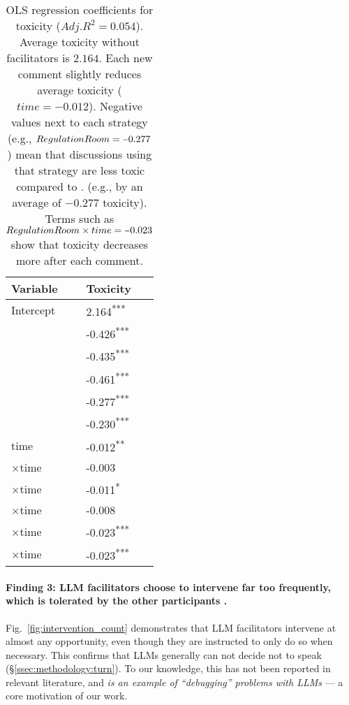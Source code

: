 \begin{table}[t]
	\centering
	\begin{tabular}{p{5cm} p{1.5cm}}
		\toprule
		\textbf{Variable} & \textbf{Toxicity} \\
		\midrule
		Intercept & 2.164\textsuperscript{***} \\
		\strategynoinstr & -0.426\textsuperscript{***} \\
		\strategymodgame & -0.435\textsuperscript{***} \\
		\strategyrules & -0.461\textsuperscript{***} \\
		\strategyregroom & -0.277\textsuperscript{***} \\
		\strategyconstrcomm & -0.230\textsuperscript{***} \\
		time & -0.012\textsuperscript{**} \\
		\strategynoinstr$\times$time & -0.003 \\
		\strategymodgame$\times$time & -0.011\textsuperscript{*} \\
		\strategyrules$\times$time & -0.008 \\
		\strategyregroom$\times$time & -0.023\textsuperscript{***} \\
		\strategyconstrcomm$\times$time & -0.023\textsuperscript{***} \\
		\bottomrule
	\end{tabular}
	\small
	\asterisknote
	\normalsize
	\caption{\ac{OLS} regression coefficients for toxicity ($Adj. R^2=0.054$). Average toxicity without facilitators is $2.164$. Each new comment slightly reduces average toxicity ($time = \minus0.012$). Negative values next to each strategy (e.g., $\strategyregroom = \minus0.277$) mean that discussions using that strategy are less toxic  compared to \textit{\strategynomod}. (e.g., by an average of $\minus0.277$ toxicity). Terms such as $\strategyregroom \times time = \minus0.023$ show that toxicity decreases more after each comment.}
	\label{tab:toxicity}
\end{table}


\paragraph{Finding 3: \ac{LLM} facilitators choose to intervene far too frequently, which is tolerated by the other participants .} Fig.~\ref{fig:intervention_count} demonstrates that \ac{LLM} facilitators intervene at almost any opportunity, even though they are instructed to only do so when necessary. This confirms that \acp{LLM} generally can not decide not to speak (\S\ref{ssec:methodology:turn}). To our knowledge, this has not been reported in relevant literature, and \emph{is an example of ``debugging'' problems with \acp{LLM}} --- a core motivation of our work.

